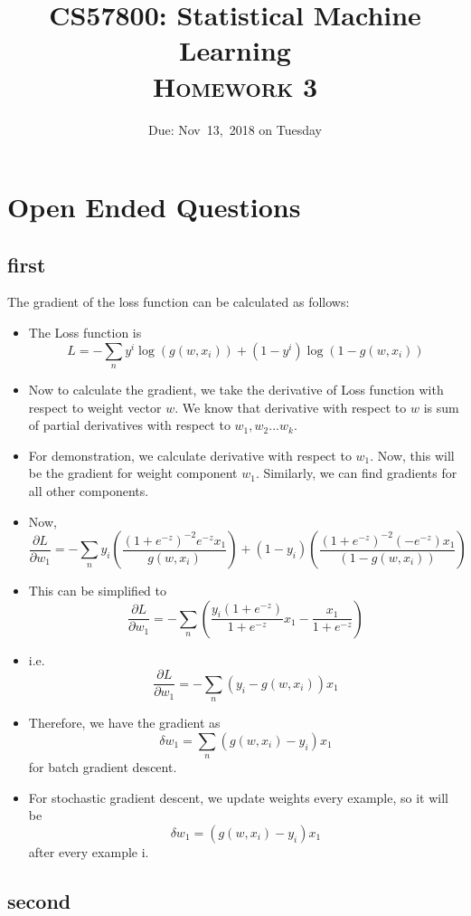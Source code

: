 \documentclass[11pt]{article}
\title{
\textbf{CS57800: Statistical Machine Learning} \\ \textsc{Homework 3} \\
\normalsize\vspace{0.1in}
}
\date{Due: Nov\ 13,\ 2018 on Tuesday}
\begin{document}
\maketitle

\section{Open Ended Questions}
\subsection{first}
The gradient of the loss function can be calculated as follows:\\
\begin{itemize}
\item The Loss function is $$L = -\sum_{n} y^{i} \log (g(w,x_i)) + (1-y^i) \log (1-g(w,x_i))$$
\item Now to calculate the gradient, we take the derivative of Loss function with respect to weight vector $w$. We know that derivative with respect to $w$ is sum of partial derivatives with respect to $w_1,w_2... w_k$.
\item For demonstration, we calculate derivative with respect to $w_1$. Now, this will be the gradient for weight component $w_1$. Similarly, we can find gradients for all other components.
\item Now, $$\frac{\partial L}{\partial w_1} = -\sum_{n} y_i (\frac{(1+e^{-z})^{-2} e^{-z} x_1}{g(w,x_i)}) + (1-y_i) (\frac{(1+e^{-z})^{-2} (-e^{-z}) x_1}{(1-g(w,x_i))})$$
\item This can be simplified to 
$$\frac{\partial L}{\partial w_1} = -\sum_{n} (\frac{y_i(1+e^{-z})} {1+e^{-z}} x_1 - \frac{x_1}{1+e^{-z}})$$
\item i.e.  $$\frac{\partial L}{\partial w_1} = -\sum_{n} (y_i - g(w,x_i))x_1$$
\item Therefore, we have the gradient as $$\delta w_1 = \sum_{n} (g(w,x_i)-y_i)x_1$$ for batch gradient descent.\\
\item For stochastic gradient descent, we update weights every example, so it will be $$\delta w_1 = (g(w,x_i)-y_i)x_1$$ after every example i.
\end{itemize}

\subsection{second}
\end{document}
